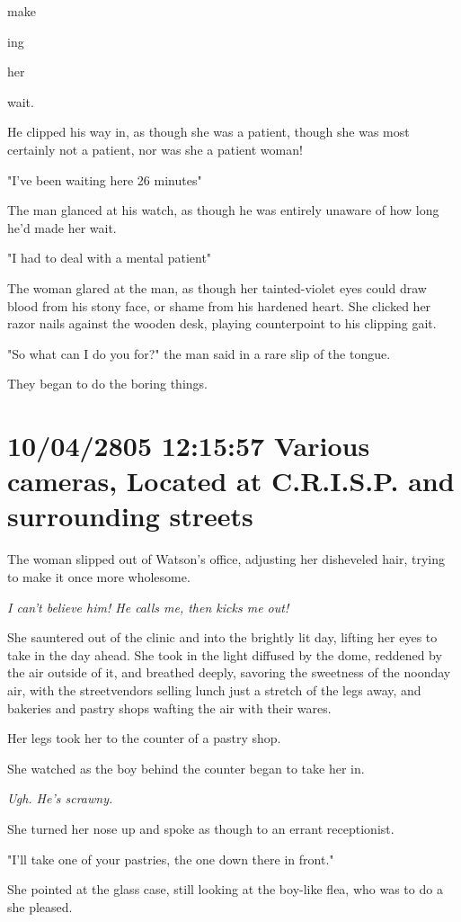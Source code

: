 \documentclass[12pt]{book}
\begin{document}
make

ing

her

wait.

He clipped his way in, as though she was a patient, though she was most certainly not a patient, nor was she a patient woman!

"I've been waiting here 26 minutes"

The man glanced at his watch, as though he was entirely unaware of how long he'd made her wait.

"I had to deal with a mental patient"

The woman glared at the man, as though her tainted-violet eyes could draw blood from his stony face, or shame from his hardened heart. She clicked her razor nails against the wooden desk, playing counterpoint to his clipping gait.

"So what can I do you for?" the man said in a rare slip of the tongue.

They began to do the boring things.

\section*{10/04/2805 12:15:57 Various cameras, Located at C.R.I.S.P. and surrounding streets}
\label{sec:orgca8a79e}

The woman slipped out of Watson's office, adjusting her disheveled hair, trying to make it once more wholesome.

\emph{I can't believe him! He calls me, then kicks me out!}

She sauntered out of the clinic and into the brightly lit day, lifting her eyes to take in the day ahead. She took in the light diffused by the dome, reddened by the air outside of it, and breathed deeply, savoring the sweetness of the noonday air, with the streetvendors selling lunch just a stretch of the legs away, and bakeries and pastry shops wafting the air with their wares.

Her legs took her to the counter of a pastry shop.

She watched as the boy behind the counter began to take her in.

\emph{Ugh. He's scrawny.}

She turned her nose up and spoke as though to an errant receptionist.

"I'll take one of your pastries, the one down there in front."

She pointed at the glass case, still looking at the boy-like flea, who was to do a she pleased.
\end{document}
